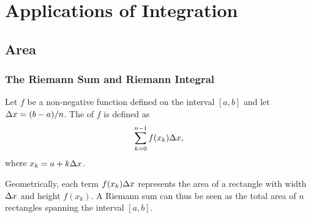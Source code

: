 \chapter{Applications of Integration}

\section{Area}\label{sec:Applications-of-Integration:Area}

\subsection{The Riemann Sum and Riemann Integral}

\begin{definition}
    Let $f$ be a non-negative function defined on the interval $[a, b]$ and let $\Delta x = (b-a)/n$. The  of $f$ is defined as \[\sum_{k = 0}^{n-1} f(x_k) \Delta x,\] where $x_k = a + k \Delta x$.
\end{definition}

Geometrically, each term $f(x_k) \Delta x$ represents the area of a rectangle with width $\Delta x$ and height $f(x_k)$. A Riemann sum can thus be seen as the total area of $n$ rectangles spanning the interval $[a, b]$.

